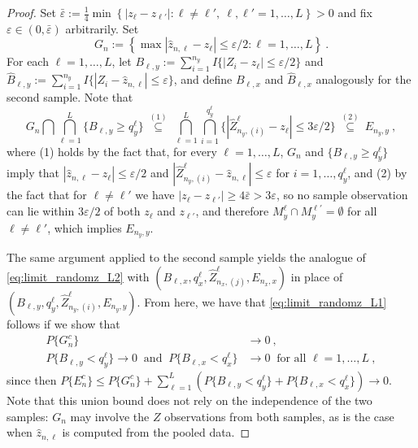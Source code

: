 \documentclass[10pt,a4paper]{amsart}
\begin{document}
\begin{proof}
  Set $\bar\varepsilon:=\frac{1}{4}\min\left\{\left\vert z_{\ell}-z_{\ell'}\right\vert: \ell\not=\ell',~\ell,\ell'=1,\ldots,L\right\}>0$ and fix $\varepsilon\in(0,\bar\varepsilon)$ arbitrarily. Set 
  \[G_{n}:=\left\{\max\left\vert\hat z_{n,\ell}-z_{\ell}\right\vert\leq \varepsilon/2:\ell=1,\ldots,L\right\}~.\]
  For each $\ell=1,\ldots,L$, let $B_{\ell,y}:=\sum_{i=1}^{n_y}I\{|Z_{i}-z_{\ell}|\leq\varepsilon/2\}$ and $\hat B_{\ell,y}:=\sum_{i=1}^{n_y}I\{|Z_{i}-\hat z_{n,\ell}|\leq\varepsilon\}$, and define $B_{\ell,x}$ and $\hat B_{\ell,x}$ analogously for the second sample. Note that
    \begin{equation}
  G_{n}\bigcap\bigcap_{\ell=1}^{L}\{B_{\ell,y}\geq q_{y}^{\ell}\}
  ~\overset{(1)}{\subseteq}~\bigcap_{\ell=1}^{L}\bigcap_{i=1}^{q_y^\ell}
  \{|\hat Z_{n_{y},(i)}^{\ell}-z_{\ell}|\leq 3\varepsilon/2\}
  ~\overset{(2)}{\subseteq}~E_{n_y,y}~,\label{eq:limit_randomz_L2}
  \end{equation}
  where (1) holds by the fact that, for every $\ell=1,\dots,L$, $G_{n}$ and $\{B_{\ell,y}\geq q_{y}^{\ell}\}$ imply that $|\hat z_{n,\ell}-z_{\ell}|\leq \varepsilon/2$ and $|\hat Z_{n_{y},(i)}^{\ell}-\hat z_{n,\ell}|\leq \varepsilon$ for $i=1,\dots,q_y^{\ell}$, and (2) by the fact that for $\ell\not=\ell'$ we have $|z_\ell-z_{\ell'}|\geq 4\bar\varepsilon>3\varepsilon$, so no sample observation can lie within $3\varepsilon/2$ of both $z_\ell$ and $z_{\ell'}$, and therefore $M_y^{\ell}\cap M_y^{\ell'}=\emptyset$ for all $\ell\not=\ell'$, which implies $E_{n_y,y}$.

The same argument applied to the second sample yields the analogue of \eqref{eq:limit_randomz_L2} with $(B_{\ell,x},q_x^\ell,\hat Z_{n_x,(j)}^{\ell},E_{n_x,x})$ in place of $(B_{\ell,y},q_y^\ell,\hat Z_{n_y,(i)}^{\ell},E_{n_y,y})$. From here, we have that \eqref{eq:limit_randomz_L1} follows if we show that
  \begin{align}
  P\{G_{n}^{c}\}&\rightarrow 0~,\label{eq:limit_randomz_L3}\\
  P\{B_{\ell,y}<q_{y}^{\ell}\}\rightarrow 0~\text{ and }~
  P\{B_{\ell,x}<q_{x}^{\ell}\}&\rightarrow 0~\text{ for all }\ell=1,\ldots,L~,
  \label{eq:limit_randomz_L4}
  \end{align}
  since then $P\{E_n^c\}\leq P\{G_n^c\}+\sum_{\ell=1}^{L}\left(P\{B_{\ell,y}<q_y^\ell\} +P\{B_{\ell,x}<q_x^\ell\}\right)\to 0$. Note that this union bound does not rely on the independence of the two samples: $G_n$ may involve the $Z$ observations from both samples, as is the case when $\hat z_{n,\ell}$ is computed from the pooled data.


\end{proof}
\end{document}
